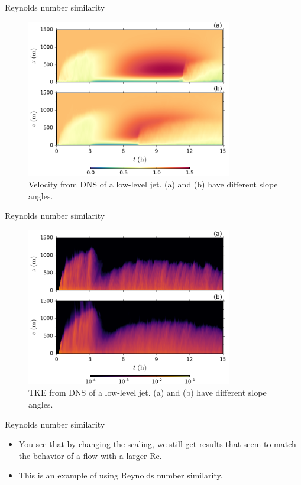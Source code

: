 \begin{frame}{Reynolds number similarity}

\begin{figure}
	\includegraphics[width=0.8\textwidth]{jet1}
	\caption{Velocity from DNS of a low-level jet. (a) and (b) have different slope angles.}
\end{figure}
\end{frame}

\begin{frame}{Reynolds number similarity}

\begin{figure}
	\includegraphics[width=0.8\textwidth]{jet2}
	\caption{TKE from DNS of a low-level jet. (a) and (b) have different slope angles.}
\end{figure}
\end{frame}

\begin{frame}{Reynolds number similarity}
\begin{itemize}
	\item You see that by changing the scaling, we still get results that seem to match the behavior of a flow with a larger Re.
	\item This is an example of using Reynolds number similarity.
\end{itemize}
\end{frame}


